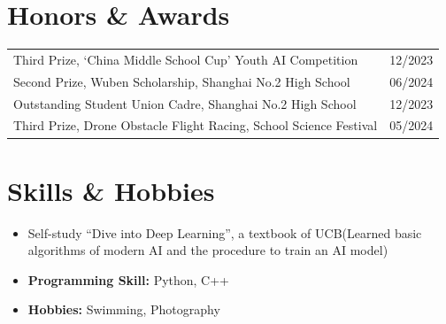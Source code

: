 \documentclass[a4paper,12pt]{article}
\makeatletter
\newenvironment{jobshort}[2]
    {
    \begin{tabularx}{\linewidth}{@{}l X r@{}}
    \textbf{#1} & \hfill &  #2 \\[3.75pt]
    \end{tabularx}
    }
    {
    }
\makeatother
\begin{document}
\section{Honors \& Awards}
\begin{tabularx}{\linewidth}{@{}l X@{}}
    Third Prize, `China Middle School Cup' Youth AI Competition        & \hfill 12/2023 \\
    Second Prize, Wuben Scholarship, Shanghai No.2 High School         & \hfill 06/2024 \\
    Outstanding Student Union Cadre, Shanghai No.2 High School         & \hfill 12/2023 \\
    Third Prize, Drone Obstacle Flight Racing, School Science Festival & \hfill 05/2024 \\
\end{tabularx}

\section{Skills \& Hobbies}
\begin{itemize}
    \item Self-study ``Dive into Deep Learning'', a textbook of UCB(Learned basic algorithms of modern AI and the procedure to train an AI model)
    \item \textbf{Programming Skill:} Python, C++
    \item \textbf{Hobbies:} Swimming, Photography
\end{itemize}






\end{document}
